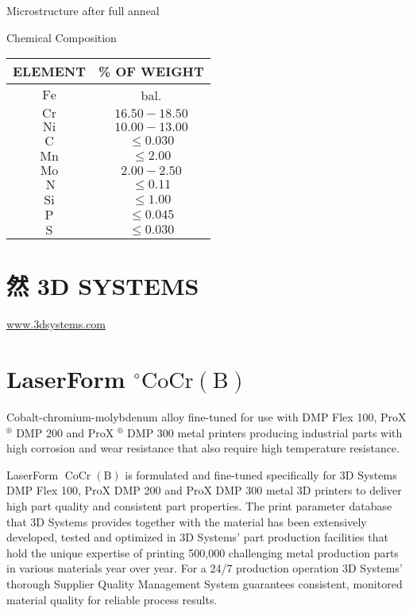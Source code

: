 \documentclass[10pt]{article}
\begin{document}
Microstructure after full anneal

Chemical Composition

\begin{center}
\begin{tabular}{|c|c|}
\hline
ELEMENT & \% OF WEIGHT \\
\hline
$\mathrm{Fe}$ & bal. \\
\hline
$\mathrm{Cr}$ & $16.50-18.50$ \\
\hline
$\mathrm{Ni}$ & $10.00-13.00$ \\
$\mathrm{C}$ & $\leq 0.030$ \\
$\mathrm{Mn}$ & $\leq 2.00$ \\
$\mathrm{Mo}$ & $2.00-2.50$ \\
$\mathrm{~N}$ & $\leq 0.11$ \\
$\mathrm{Si}$ & $\leq 1.00$ \\
$\mathrm{P}$ & $\leq 0.045$ \\
\hline
$\mathrm{S}$ & $\leq 0.030$ \\
\hline
\end{tabular}
\end{center}

\section*{然 3D SYSTEMS}
\href{http://www.3dsystems.com}{www.3dsystems.com}

\section*{LaserForm ${ }^{\circ} \mathrm{CoCr}(\mathrm{B})$}
Cobalt-chromium-molybdenum alloy fine-tuned for use with DMP Flex 100, ProX ${ }^{\circledR}$ DMP 200 and ProX ${ }^{\circledR}$ DMP 300 metal printers producing industrial parts with high corrosion and wear resistance that also require high temperature resistance.

LaserForm $\operatorname{CoCr}(\mathrm{B})$ is formulated and fine-tuned specifically for 3D Systems DMP Flex 100, ProX DMP 200 and ProX DMP 300 metal 3D printers to deliver high part quality and consistent part properties. The print parameter database that 3D Systems provides together with the material has been extensively developed, tested and optimized in 3D Systems' part production facilities that hold the unique expertise of printing 500,000 challenging metal production parts in various materials year over year. For a 24/7 production operation 3D Systems' thorough Supplier Quality Management System guarantees consistent, monitored material quality for reliable process results.
\end{document}
